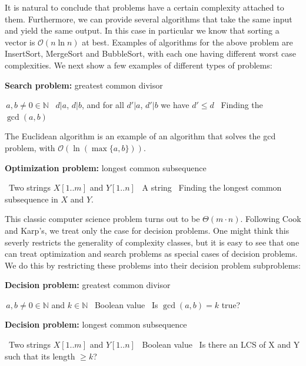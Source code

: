 \documentclass{amsart}
\theoremstyle{plain}
\newcommand{\bigo}{\mathcal{O}}
\begin{document}
It is natural to conclude that problems have a certain complexity attached to them. Furthermore, we
can provide several algorithms that take the same input and yield the same output. In this case in
particular we know that sorting a vector is $\bigo(n\ln n)$ at best. Examples of algorithms for the
above problem are InsertSort, MergeSort and BubbleSort, with each one having different worst case
complexities. We next show a few examples of different types of problems:

\begin{algorithm}[h]
  \caption*{\textbf{Search problem:} greatest common divisor}
  \begin{algorithmic}[1]
    \Require\,$a, b\neq 0\in\mathbb{N}$
    \Ensure\, $d|a$, $d|b$, and for all $d'|a$, $d'|b$ we have $d'\leq d$
    \Statex\, Finding the $\gcd(a, b)$
  \end{algorithmic}
\end{algorithm}

The Euclidean algorithm is an example of an algorithm that solves the gcd problem, with
$\bigo(\ln(\max\{a,b\}))$.

\begin{algorithm}[h]
  \caption*{\textbf{Optimization problem:} longest common subsequence}
  \begin{algorithmic}[1]
    \Require\, Two strings $X[1..m]$ and $Y[1..n]$
    \Ensure\, A string
    \Statex\, Finding the longest common subsequence in $X$ and $Y$.
  \end{algorithmic}
\end{algorithm}

This classic computer science problem turns out to be $\Theta(m\cdot n)$. Following Cook and
Karp's, we treat only the case for decision problems. One might think this severly restricts the
generality of complexity classes, but it is easy to see that one can treat optimization and search
problems as special cases of decision problems. We do this by restricting these problems into their
decision problem subproblems:

\begin{algorithm}[h]
  \caption*{\textbf{Decision problem:} greatest common divisor}
  \begin{algorithmic}[1]
    \Require\,$a, b\neq 0\in\mathbb{N}$ and $k\in\mathbb{N}$
    \Ensure\, Boolean value
    \Statex\, Is $\gcd(a, b)=k$ true?
  \end{algorithmic}
\end{algorithm}

\begin{algorithm}[h]
  \caption*{\textbf{Decision problem:} longest common subsequence}
  \begin{algorithmic}[1]
    \Require\, Two strings $X[1..m]$ and $Y[1..n]$
    \Ensure\, Boolean value
    \Statex\, Is there an LCS of X and Y such that its length $\geq k$?
  \end{algorithmic}
\end{algorithm}
\end{document}
